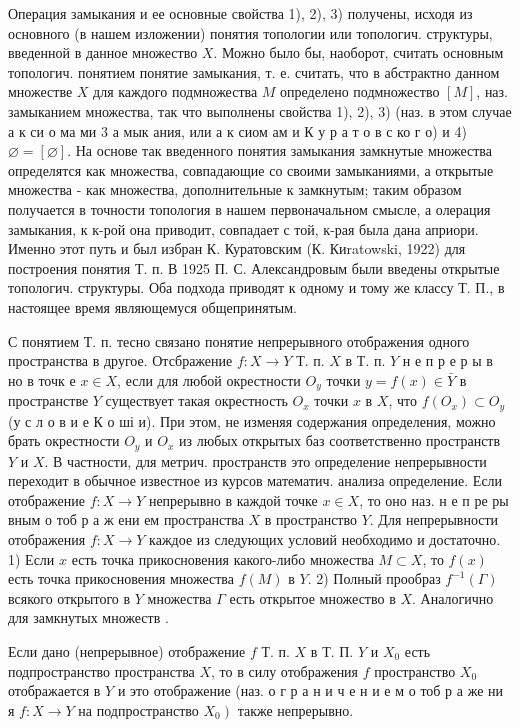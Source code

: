 \documentclass[10pt]{article}
\begin{document}
Операция замыкания и ее основные свойства 1), 2), 3) получены, исходя из основного (в нашем изложении) понятия топологии или топологич. структуры, введенной в данное множество $X$. Можно было бы, наоборот, считать основным топологич. понятием понятие замыкания, т. е. считать, что в абстрактно данном множестве $X$ для каждого подмножества $M$ определено подмножество $[M]$, наз. замыканием множества, так что выполнены свойства 1), 2), 3) (наз. в этом случае а к си о ма ми 3 а мык ания, или а к сиом ам и К у р а т о в с ко г о) и 4) $\varnothing=[\varnothing]$. На основе так введенного понятия замыкания замкнутые множества определятся как множества, совпадающие со своими замыканиями, а открытые множества - как множества, дополнительные к замкнутым; таким образом получается в точности топология в нашем первоначальном смысле, а олерация замыкания, к к-рой она приводит, совпадает с той, к-рая была дана априори. Именно этот путь и был избран К. Куратовским (К. Киratowski, 1922) для построения понятия Т. п. В 1925 П. С. Александровым были введены открытые топологич. структуры. Оба подхода приводят к одному и тому же классу Т. П., в настоящее время являющемуся общепринятым.



С понятием Т. п. тесно связано понятие непрерывного отображения одного пространства в другое. Отсбражение $f: X \rightarrow Y$ Т. п. $X$ в Т. п. $Y$ н е п р е р ы в но в точк е $x \in X$, если для любой окрестности $O_{y}$ точки $y=f(x) \in \bar{Y}$ в пространстве $Y$ существует такая окрестность $O_{x}$ точки $x$ в $X$, что $f\left(O_{x}\right) \subset O_{y}$ (у с л о в и е К о ші и). При этом, не изменяя содержания определения, можно брать окрестности $O_{y}$ и $O_{x}$ из любых открытых баз соответственно пространств $Y$ и $X$. В частности, для метрич. пространств это определение непрерывности переходит в обычное известное из курсов математич. анализа определение. Если отображение $f: X \rightarrow Y$ непрерывно в каждой точке $x \in X$, то оно наз. н е п ре ры вным о тоб р а ж ени ем пространства $X$ в пространство $Y$. Для непрерывности отображения $f: X \rightarrow Y$ каждое из следующих условий необходимо и достаточно. 1) Если $x$ есть точка прикосновения какого-либо множества $M \subset X$, то $f(x)$ есть точка прикосновения множества $f(M)$ в $Y$. 2) Полный прообраз $f^{-1}(\Gamma)$ всякого открытого в $Y$ множества $\Gamma$ есть открытое множество в $X$. Аналогично для замкнутых множеств .



Если дано (непрерывное) отображение $f$ Т. п. $X$ в Т. П. $Y$ и $X_{0}$ есть подпространство пространства $X$, то в силу отображения $f$ пространство $X_{0}$ отображается в $Y$ и это отображение (наз. о г р а н и ч е н и е м о тоб р а же ни я $f: X \rightarrow Y$ на подпространство $\left.X_{0}\right)$ также непрерывно.
\end{document}
